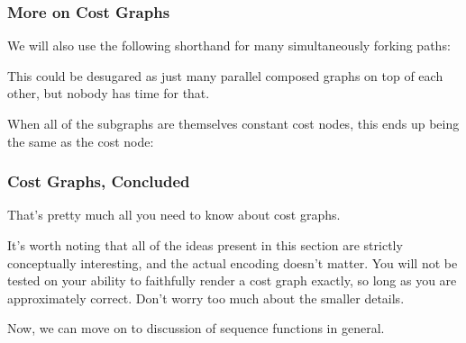 \documentclass[aspectratio=169, handout]{beamer}
\newcommand{\hex}[4][]{\node[hex, #1, minimum size=1cm] (#2) {$W$: #3 \\ $S$: #4}}
\begin{document}
\begin{frame}[fragile]
  \frametitle{More on Cost Graphs}

  We will also use the following shorthand for many simultaneously
  forking paths:

  \begin{center}
  \end{center}

  \pause
  \vspace{\fill}

  This could be desugared as just many parallel composed graphs on top of each
  other, but nobody has time for that.

  \pause
  \vspace{\fill}

  When all of the subgraphs are themselves constant cost nodes, this ends up being
  the same as the cost node:
  \begin{center}
  \end{center}
\end{frame}

\begin{frame}[fragile]
  \frametitle{Cost Graphs, Concluded}

  That's pretty much all you need to know about cost graphs.

  \pause
  \vspace{\fill}

  It's worth noting that all of the ideas present in this section
  are strictly conceptually interesting, and the actual encoding doesn't
  matter. You will not be tested on your ability to faithfully render a
  cost graph exactly, so long as you are approximately correct. Don't
  worry too much about the smaller details.

  \pause
  \vspace{\fill}

  Now, we can move on to discussion of sequence functions in general.
\end{frame}
\end{document}
